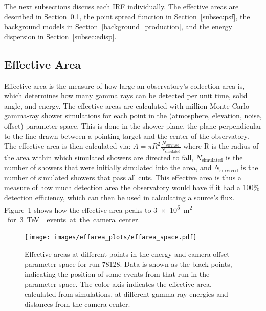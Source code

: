   The next subsections discuss each IRF individually.
  The effective areas are described in Section~\ref{subsec:effarea}, the point spread function in Section~\ref{subsec:psf}, the background models in Section~\ref{background_production}, and the energy dispersion in Section~\ref{subsec:edisp}.

  \FloatBarrier
  
  \subsection{Effective Area}\label{subsec:effarea}
    Effective area is the measure of how large an observatory's collection area is, which determines how many gamma rays can be detected per unit time, solid angle, and energy.
    The effective areas are calculated with  million Monte Carlo gamma-ray shower simulations for each point in the (atmosphere, elevation, noise, offset) parameter space.
    This is done in the shower plane, the plane perpendicular to the line drawn between a pointing target and the center of the observatory.
    The effective area is then calculated via:
    $A=\pi R^2 \frac{N_{\text{survived}}}{N_{\text{simulated}}}$
    where R is the radius of the area within which simulated showers are directed to fall, $N_{\text{simulated}}$ is the number of showers that were initially simulated into the area, and $N_{\text{survived}}$ is the number of simulated showers that pass all cuts.
    This effective area is thus a measure of how much detection area the observatory would have if it had a 100\% detection efficiency, which can then be used in calculating a source's flux.
    Figure~\ref{fig:effarea_paramspace} shows how the effective area peaks to \nicetilde{}\SI{3e5}{m${}^2$} for \SI{3}{\TeV{}} events at the camera center.

    \begin{figure}[!t]
      \centering
      \texttt{[image: images/effarea\_plots/effarea\_space.pdf]}
      \caption[Effective Area Parameter Space]{
        Effective areas at different points in the energy and camera offset parameter space for run 78128.
        Data is shown as the black points, indicating the position of some events from that run in the parameter space.
        The color axis indicates the effective area, calculated from simulations, at different gamma-ray energies and distances from the camera center.
      }
      \label{fig:effarea_paramspace}
    \end{figure}

